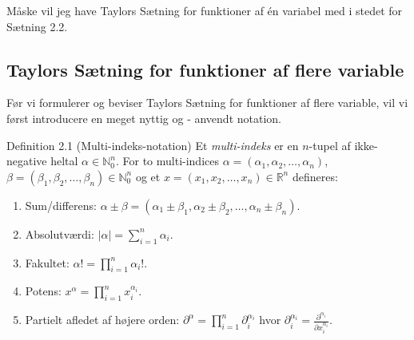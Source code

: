 Måske vil jeg have Taylors Sætning for funktioner af én variabel med i stedet for Sætning 2.2.

\subsection{Taylors Sætning for funktioner af flere variable}
Før vi formulerer og beviser Taylors Sætning for funktioner af flere variable, vil vi først introducere en meget nyttig og - anvendt notation.
\begin{boks}{Definition 2.1 (Multi-indeks-notation)}
  Et \textit{multi-indeks} er en $n$-tupel af ikke-negative heltal $\alpha \in \mathbb{N}_0^n$. For to multi-indices $\alpha = (\alpha_1, \alpha_2, \ldots, \alpha_n)$, $\beta = (\beta_1, \beta_2, \ldots, \beta_n) \in \mathbb{N}_0^n$ og et $x = (x_1, x_2, \ldots, x_n) \in \mathbb{R}^n$ defineres:
  \begin{enumerate}[label = \arabic*.]
    \item Sum/differens: $\alpha \pm \beta = (\alpha_1 \pm \beta_1, \alpha_2 \pm \beta_2, \ldots, \alpha_n \pm \beta_n).$
    \item  Absolutværdi: $|\alpha| = \sum_{i = 1}^n \alpha_i.$
    \item Fakultet: $\alpha! = \prod_{i = 1}^n \alpha_i!.$
    \item Potens: $x^\alpha = \prod_{i = 1}^n x_i^{\alpha_i}.$
    \item Partielt afledet af højere orden: $\partial^\alpha = \prod_{i = 1}^n \partial_i^{\alpha_i}$ hvor $\partial_i^{\alpha_i} = \frac{\partial^{\alpha_i}}{\partial x_i^{\alpha_i}}.$
  \end{enumerate}
\end{boks}

